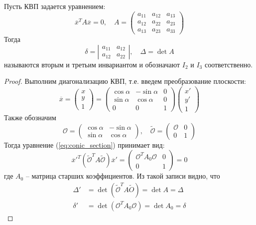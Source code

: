 \begin{Thm}
	Пусть КВП задается уравнением:
	\begin{equation} \label{eq:conic_section}
		\overline{x}^T A \overline{x} = 0, \quad A = \left(\begin{array}{ccc}
	a_{11} & a_{12} & a_{13} \\ 
	a_{12} & a_{22} & a_{23} \\ 
	a_{13} & a_{23} & a_{33}
	\end{array}\right)
	\end{equation}
	Тогда
	\[\delta = \left|\begin{array}{cc}
	a_{11} & a_{12} \\ 
	a_{12} & a_{22}
	\end{array}\right|, \quad \Delta = \det A\]
	называются вторым и третьим инвариантом и обозначают $I_2$ и $I_3$ соответственно. 
\end{Thm}

\begin{proof}
	Выполним диагонализацию КВП, т.е. введем преобразование плоскости:
	\begin{equation*}
		\overline{x} = \left(\begin{array}{c}
		x \\ 
		y \\ 
		1
		\end{array}\right) = \left(\begin{array}{ccc}
		\cos \alpha & -\sin \alpha & 0 \\ 
		\sin \alpha & \cos \alpha & 0 \\ 
		0 & 0 & 1
		\end{array}\right) \left(\begin{array}{c}
		x' \\ 
		y' \\ 
		1
		\end{array}\right)
	\end{equation*}
	Также обозначим 
	\[\mathcal{O} = \left(\begin{array}{cc}
	\cos \alpha & -\sin \alpha \\ 
	\sin \alpha & \cos \alpha
	\end{array}\right), \quad \widetilde{\mathcal{O}} = \left(\begin{array}{c|c}
	\mathcal{O} & 0 \\ 
	\hline
	0 & 1
	\end{array}\right)\]
	Тогда уравнение (\ref{eq:conic_section}) принимает вид:
	\[\overline{x}'^T \left(\widetilde{\mathcal{O}}^T A \widetilde{\mathcal{O}}\right) \overline{x}' = \left(\begin{array}{c|c}
	\mathcal{O}^T A_0 \mathcal{O} & 0 \\
	\hline
	0 & 1
	\end{array}\right) = 0\]
	где $A_0$ -- матрица старших коэффициентов.
	Из такой записи видно, что
	\begin{align*}
		\Delta' &= \det \left(\widetilde{\mathcal{O}}^T A \widetilde{O}\right) = \det A = \Delta \\
		\delta' &= \det \left(\mathcal{O}^T A_0 \mathcal{O}\right) = \det A_0 = \delta
	\end{align*}
\end{proof}

